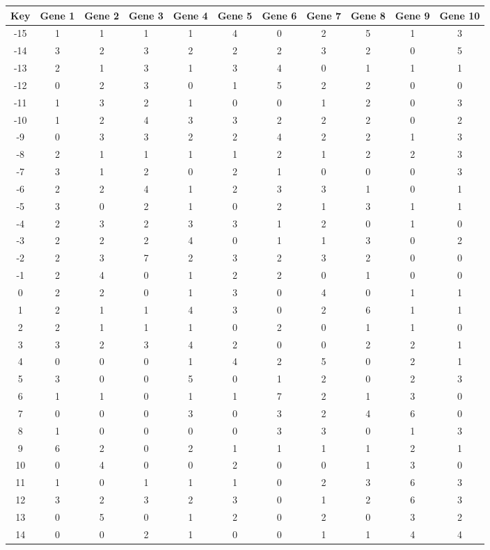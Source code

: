 \begin{tabular}{|c|c|c|c|c|c|c|c|c|c|c|}
\hline
Key & Gene 1 & Gene 2 & Gene 3 & Gene 4 & Gene 5 & Gene 6 & Gene 7 & Gene 8 & Gene 9 & Gene 10 \\
\hline
-15 & 1 & 1 & 1 & 1 & 4 & 0 & 2 & 5 & 1 & 3 \\
-14 & 3 & 2 & 3 & 2 & 2 & 2 & 3 & 2 & 0 & 5 \\
-13 & 2 & 1 & 3 & 1 & 3 & 4 & 0 & 1 & 1 & 1 \\
-12 & 0 & 2 & 3 & 0 & 1 & 5 & 2 & 2 & 0 & 0 \\
-11 & 1 & 3 & 2 & 1 & 0 & 0 & 1 & 2 & 0 & 3 \\
-10 & 1 & 2 & 4 & 3 & 3 & 2 & 2 & 2 & 0 & 2 \\
-9 & 0 & 3 & 3 & 2 & 2 & 4 & 2 & 2 & 1 & 3 \\
-8 & 2 & 1 & 1 & 1 & 1 & 2 & 1 & 2 & 2 & 3 \\
-7 & 3 & 1 & 2 & 0 & 2 & 1 & 0 & 0 & 0 & 3 \\
-6 & 2 & 2 & 4 & 1 & 2 & 3 & 3 & 1 & 0 & 1 \\
-5 & 3 & 0 & 2 & 1 & 0 & 2 & 1 & 3 & 1 & 1 \\
-4 & 2 & 3 & 2 & 3 & 3 & 1 & 2 & 0 & 1 & 0 \\
-3 & 2 & 2 & 2 & 4 & 0 & 1 & 1 & 3 & 0 & 2 \\
-2 & 2 & 3 & 7 & 2 & 3 & 2 & 3 & 2 & 0 & 0 \\
-1 & 2 & 4 & 0 & 1 & 2 & 2 & 0 & 1 & 0 & 0 \\
0 & 2 & 2 & 0 & 1 & 3 & 0 & 4 & 0 & 1 & 1 \\
1 & 2 & 1 & 1 & 4 & 3 & 0 & 2 & 6 & 1 & 1 \\
2 & 2 & 1 & 1 & 1 & 0 & 2 & 0 & 1 & 1 & 0 \\
3 & 3 & 2 & 3 & 4 & 2 & 0 & 0 & 2 & 2 & 1 \\
4 & 0 & 0 & 0 & 1 & 4 & 2 & 5 & 0 & 2 & 1 \\
5 & 3 & 0 & 0 & 5 & 0 & 1 & 2 & 0 & 2 & 3 \\
6 & 1 & 1 & 0 & 1 & 1 & 7 & 2 & 1 & 3 & 0 \\
7 & 0 & 0 & 0 & 3 & 0 & 3 & 2 & 4 & 6 & 0 \\
8 & 1 & 0 & 0 & 0 & 0 & 3 & 3 & 0 & 1 & 3 \\
9 & 6 & 2 & 0 & 2 & 1 & 1 & 1 & 1 & 2 & 1 \\
10 & 0 & 4 & 0 & 0 & 2 & 0 & 0 & 1 & 3 & 0 \\
11 & 1 & 0 & 1 & 1 & 1 & 0 & 2 & 3 & 6 & 3 \\
12 & 3 & 2 & 3 & 2 & 3 & 0 & 1 & 2 & 6 & 3 \\
13 & 0 & 5 & 0 & 1 & 2 & 0 & 2 & 0 & 3 & 2 \\
14 & 0 & 0 & 2 & 1 & 0 & 0 & 1 & 1 & 4 & 4 \\
\hline
\end{tabular}